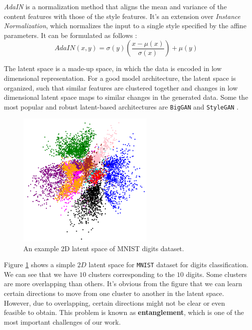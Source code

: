 \emph{AdaIN} is a normalization method that aligns the mean and variance of the content features with those of the style features. It's an extension over \emph{Instance Normalization}, which normalizes the input to a single style specified by the affine parameters. It can be formulated as follows :
\begin{equation}
    AdaIN(x,y) = \sigma(y)(\frac{x - \mu(x)}{\sigma(x)}) + \mu(y)
\end{equation}

The latent space is a made-up space, in which the data is encoded in low dimensional representation. For a good model architecture, the latent space is organized, such that similar features are clustered together and changes in low dimensional latent space maps to similar changes in the generated data. Some the most popular and robust latent-based architectures are \texttt{BigGAN} \cite{brock2019large} and \texttt{StyleGAN} \cite{karras2019stylebased} \cite{karras2020analyzing}. 

\begin{figure}[H]
    \centering
    \includegraphics[width=0.6\textwidth]{images/latent-space.png}
    \caption{An example 2D latent space of MNIST digits dataset.}
    \label{fig:lspace}
\end{figure}

Figure \ref{fig:lspace} shows a simple $2D$ latent space for \texttt{MNIST} dataset for digits classification. We can see that we have $10$ clusters corresponding to the $10$ digits. Some clusters are more overlapping than others. It's obvious from the figure that we can learn certain directions to move from one cluster to another in the latent space. However, due to overlapping, certain directions might not be clear or even feasible to obtain. This problem is known as \textbf{entanglement}, which is one of the most important challenges of our work.

